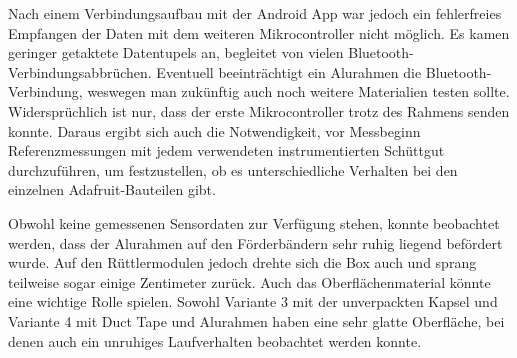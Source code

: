 Nach einem Verbindungsaufbau mit der Android App war jedoch ein fehlerfreies Empfangen der Daten mit dem weiteren Mikrocontroller nicht möglich. Es kamen geringer getaktete Datentupels an, begleitet von vielen Bluetooth-Verbindungsabbrüchen. Eventuell beeinträchtigt ein Alurahmen die Bluetooth-Verbindung, weswegen man zukünftig auch noch weitere Materialien testen sollte. Widersprüchlich ist nur, dass der erste Mikrocontroller trotz des Rahmens senden konnte. Daraus ergibt sich auch die Notwendigkeit, vor Messbeginn Referenzmessungen mit jedem verwendeten instrumentierten Schüttgut durchzuführen, um festzustellen, ob es unterschiedliche Verhalten bei den einzelnen Adafruit-Bauteilen gibt.

Obwohl keine gemessenen Sensordaten zur Verfügung stehen, konnte beobachtet werden, dass der Alurahmen auf den Förderbändern sehr ruhig liegend befördert wurde. Auf den Rüttlermodulen jedoch drehte sich die Box auch und sprang teilweise sogar einige Zentimeter zurück. Auch das Oberflächenmaterial könnte eine wichtige Rolle spielen. Sowohl Variante 3 mit der unverpackten Kapsel und Variante 4 mit Duct Tape und Alurahmen haben eine sehr glatte Oberfläche, bei denen auch ein unruhiges Laufverhalten beobachtet werden konnte.
